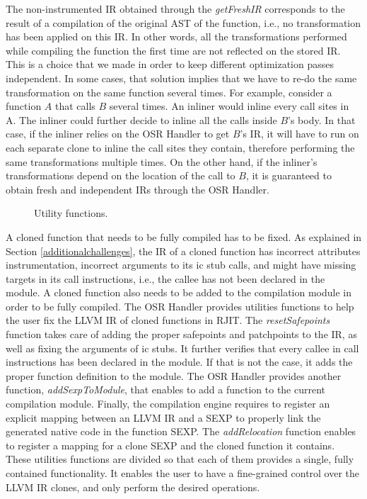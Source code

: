 The non-instrumented IR obtained through the \textit{getFreshIR} corresponds to the result of a compilation of the original AST of the function, i.e., no transformation has been applied on this IR. 
In other words, all the transformations performed while compiling the function the first time are not reflected on the stored IR. 
This is a choice that we made in order to keep different optimization passes independent.
In some cases, that solution implies that we have to re-do the same transformation on the same function several times.
For example, consider a function $A$ that calls $B$ several times.
An inliner would inline every call sites in A.
The inliner could further decide to inline all the calls inside $B$'s body.
In that case, if the inliner relies on the OSR Handler to get $B$'s IR, it will have to run on each separate clone to inline the call sites they contain, therefore performing the same transformations multiple times.
On the other hand, if the inliner's transformations depend on the location of the call to $B$, it is guaranteed to obtain fresh and independent IRs through the OSR Handler.\\

\begin{figure}[h]
\caption{Utility functions.}
\label{fig:utilityfunctions}
\end{figure}

A cloned function that needs to be fully compiled has to be fixed.
As explained in Section \ref{additionalchallenges}, the IR of a cloned function has incorrect attributes instrumentation, incorrect arguments to its ic stub calls, and might have missing targets in its call instructions, i.e., the callee has not been declared in the module.
A cloned function also needs to be added to the compilation module in order to be fully compiled.
The OSR Handler provides utilities functions to help the user fix the LLVM IR of cloned functions in RJIT. 
The \textit{resetSafepoints} function takes care of adding the proper safepoints and patchpoints to the IR, as well as fixing the arguments of ic stubs.
It further verifies that every callee in call instructions has been declared in the module. 
If that is not the case, it adds the proper function definition to the module.
The OSR Handler provides another function, \textit{addSexpToModule}, that enables to add a function to the current compilation module.
Finally, the compilation engine requires to register an explicit mapping between an LLVM IR and a SEXP to properly link the generated native code in the function SEXP.
The \textit{addRelocation} function enables to register a mapping for a clone SEXP and the cloned function it contains.
These utilities functions are divided so that each of them provides a single, fully contained functionality. 
It enables the user to have a fine-grained control over the LLVM IR clones, and only perform the desired operations.\\

